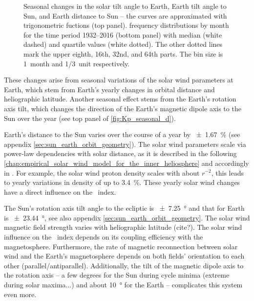 \begin{figure}[htb]
\begin{floatrow}
{		}{
			\caption{Seasonal changes in the solar tilt angle to Earth, Earth tilt angle to Sun, and Earth distance to Sun -- the curves are approximated with trigonometric fuctions (top panel). \Kp{} frequency distributions by month for the time period 1932--2016 (bottom panel) with median (white dashed) and quartile values (white dotted). The other dotted lines mark the upper eighth, 16th, 32nd, and 64th parts. The bin size is 1~month and \SI{1/3}{\Kp}~unit respectively.}
			\label{fig:Kp_seasonal_d}
		}
	\end{floatrow}
\end{figure}
These \Kp{} changes arise from seasonal variations of the solar wind parameters at Earth, which stem from Earth's yearly changes in orbital distance and heliographic latitude. Another seasonal effect stems from the Earth's rotation axis tilt, which changes the direction of the Earth's magnetic dipole axis to the Sun over the year (see top panel of \autoref{fig:Kp_seasonal_d}).

Earth's distance to the Sun varies over the course of a year by \SI{+-1.67}{\percent} (see appendix \autoref{sec:sun_earth_orbit_geometry}). The solar wind parameters scale via power-law dependencies with solar distance, as it is described in the following \autoref{chap:empirical_solar_wind_model_for_the_inner_heliosphere} and accordingly in \citet{Venzmer2018}. For example, the solar wind proton density scales with about $r^{-2}$, this leads to yearly variations in density of up to \SI{3.4}{\percent}. These yearly solar wind changes have a direct influence on the \Kp{}~index.

The Sun's rotation axis tilt angle to the ecliptic is \SI{+-7.25}{\degree} and that for Earth is \SI{+-23.44}{\degree}, see also appendix \autoref{sec:sun_earth_orbit_geometry}. The solar wind magnetic field strength varies with heliographic latitude (cite?). The solar wind influence on the \Kp{}~index depends on its coupling efficiency with the magnetosphere. Furthermore, the rate of magnetic reconnection between solar wind and the Earth's magnetosphere depends on both fields' orientation to each other (parallel/antiparallel). Additionally, the tilt of the magnetic dipole axis to the rotation axis -- a few degrees for the Sun during cycle minima (extreme during solar maxima...) and about \SI{10}{\degree} for the Earth -- complicates this system even more.

